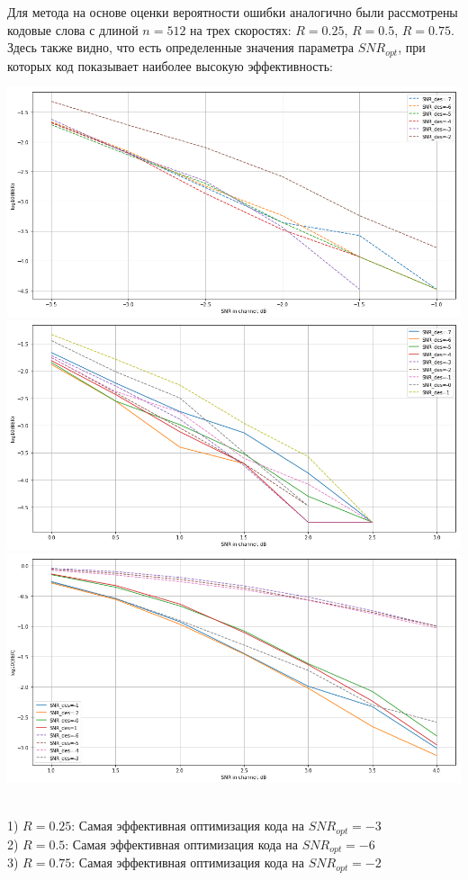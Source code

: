 \documentclass[a1paper,portrait,fontscale=0.554]{baposter}
\begin{document}
\begin{poster}
{Для метода на основе оценки вероятности ошибки аналогично были рассмотрены кодовые слова с длиной $n = 512$ на трех скоростях: $R =  0.25$, $R = 0.5$, $R = 0.75$.
Здесь также видно, что есть определенные значения  параметра  $SNR_{opt}$, при которых код показывает наиболее высокую эффективность:
\\
\begin{center}
\includegraphics[width=0.5\linewidth]{DE_0_25}
\includegraphics[width=0.5\linewidth]{DE_0_5}
\includegraphics[width=0.5\linewidth]{DE_0_75}
\end{center}
\\
1) $R=0.25$: Самая эффективная оптимизация кода на $ SNR_{opt} = -3$
\\
2) $R=0.5$:  Самая эффективная оптимизация кода на $ SNR_ {opt} = -6$
\\
3) $R=0.75$: Самая эффективная оптимизация кода на $ SNR_{opt} = -2$
\\

}
\end{poster}
\end{document}
